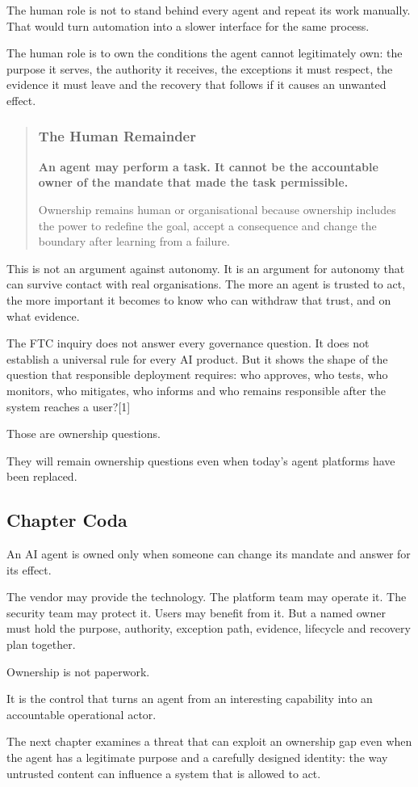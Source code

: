 The human role is not to stand behind every agent and repeat its work
manually. That would turn automation into a slower interface for the
same process.

The human role is to own the conditions the agent cannot legitimately
own: the purpose it serves, the authority it receives, the exceptions it
must respect, the evidence it must leave and the recovery that follows
if it causes an unwanted effect.

\begin{quote}
\subsubsection{The Human Remainder}\label{the-human-remainder-1}

\textbf{An agent may perform a task. It cannot be the accountable owner
of the mandate that made the task permissible.}

Ownership remains human or organisational because ownership includes the
power to redefine the goal, accept a consequence and change the boundary
after learning from a failure.
\end{quote}

This is not an argument against autonomy. It is an argument for autonomy
that can survive contact with real organisations. The more an agent is
trusted to act, the more important it becomes to know who can withdraw
that trust, and on what evidence.

The FTC inquiry does not answer every governance question. It does not
establish a universal rule for every AI product. But it shows the shape
of the question that responsible deployment requires: who approves, who
tests, who monitors, who mitigates, who informs and who remains
responsible after the system reaches a user?{[}1{]}

Those are ownership questions.

They will remain ownership questions even when today's agent platforms
have been replaced.

\subsection{Chapter Coda}\label{chapter-coda}

An AI agent is owned only when someone can change its mandate and answer
for its effect.

The vendor may provide the technology. The platform team may operate it.
The security team may protect it. Users may benefit from it. But a named
owner must hold the purpose, authority, exception path, evidence,
lifecycle and recovery plan together.

Ownership is not paperwork.

It is the control that turns an agent from an interesting capability
into an accountable operational actor.

The next chapter examines a threat that can exploit an ownership gap
even when the agent has a legitimate purpose and a carefully designed
identity: the way untrusted content can influence a system that is
allowed to act.
